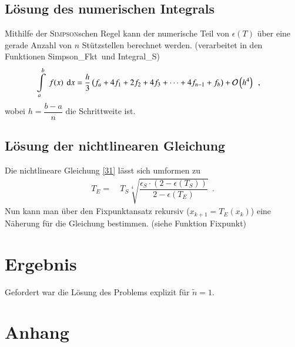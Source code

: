 \documentclass[12pt,a4paper,titlepage]{scrreprt}
\begin{document}
	\subsection{Lösung des numerischen Integrals}
	Mithilfe der \textsc{Simpson}schen Regel kann der numerische Teil von $\epsilon(T)$ über eine gerade Anzahl von $n$ Stützstellen berechnet werden.
	(verarbeitet in den Funktionen \glqq Simpson\_Fkt\grqq~und \glqq Integral\_S\grqq)
	\begin{align}
		\int\limits_a^b~f(x)~\dif x =&~\dfrac{h}{3}\left(f_a+4f_1+2f_2+4f_3+\dots+4f_{n-1}+f_b\right)+\mathcal{O}\left(h^4\right)~~,
	\end{align}
	wobei $h=\dfrac{b-a}{n}$ die Schrittweite ist.
	
	\subsection{Lösung der nichtlinearen Gleichung}
	Die nichtlineare Gleichung \eqref{31} lässt sich umformen zu
	\begin{align}
		T_E=&~T_S\sqrt[4]{\dfrac{\epsilon_S\cdot\left(2-\epsilon\left(T_S\right)\right)}{2-\epsilon\left(T_E\right)}}~~.
	\end{align}
	Nun kann man über den Fixpunktansatz rekursiv ($x_{k+1}=T_E(x_k)$)  eine Näherung für die Gleichung bestimmen. (siehe Funktion \glqq Fixpunkt\grqq)
	
	
	\section{Ergebnis}
	Gefordert war die Lösung des Problems explizit für $\tilde{n}=1$.

	
	\section{Anhang}

	
\end{document}
